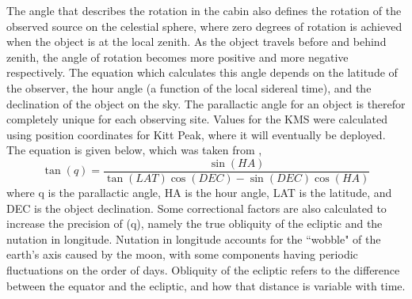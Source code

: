 \documentclass[manuscript]{aastex}
\begin{document}
The angle that describes the rotation in the cabin also defines the rotation of the observed source on the celestial sphere, where zero degrees of rotation is achieved when the object is at the local zenith. As the object travels before and behind zenith, the angle of rotation becomes more positive and more negative respectively. The equation which calculates this angle depends on the latitude of the observer, the hour angle (a function of the local sidereal time), and the declination of the object on the sky. The parallactic angle for an object is therefor completely unique for each observing site. Values for the KMS were calculated using position coordinates for Kitt Peak, where it will eventually be deployed. The equation is given below, which was taken from \cite{Meeus1998},
\begin{equation}\label{eq:parangle}
\tan(q) = \frac{\sin{(HA)}}{\tan(LAT)\cos{(DEC)} - \sin{(DEC)}\cos{(HA)}}
\end{equation}
where q is the parallactic angle, HA is the hour angle, LAT is the latitude, and DEC is the object declination. Some correctional factors are also calculated to increase the precision of (q), namely the true obliquity of the ecliptic and the nutation in longitude. Nutation in longitude accounts for the ``wobble" of the earth's axis caused by the moon, with some components having periodic fluctuations on the order of days. Obliquity of the ecliptic refers to the difference between the equator and the ecliptic, and how that distance is variable with time.
\end{document}
